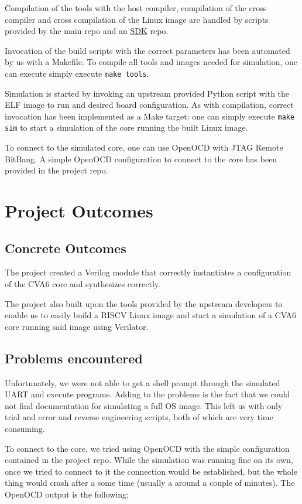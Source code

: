 \documentclass[a4paper,11pt]{article}
\begin{document}
Compilation of the tools with the host compiler, compilation of the cross compiler
and cross compilation of the Linux image are handled by scripts provided by the
main repo and an \href{https://github.com/openhwgroup/cva6-sdk}{SDK} repo.

Invocation of the build scripts with the correct parameters has been automated by us
with a Makefile. To compile all tools and images needed for simulation, one can execute
simply execute \texttt{make tools}.

Simulation is started by invoking an upstream provided Python script with the
ELF image to run and desired board configuration. As with compilation, correct
invocation has been implemented as a Make target: one can simply execute
\texttt{make sim} to start a simulation of the core running the built Linux
image.

To connect to the simulated core, one can use OpenOCD with JTAG Remote BitBang.
A simple OpenOCD configuration to connect to the core has been provided in the
project repo.

\section{Project Outcomes}

\subsection{Concrete Outcomes}

The project created a Verilog module that correctly instantiates a configuration
of the CVA6 core and synthesizes correctly.

The project also built upon the tools provided by the upstream developers to
enable us to easily build a RISCV Linux image and start a simulation of a CVA6
core running said image using Verilator.

\subsection{Problems encountered}

Unfortunately, we were not able to get a shell prompt through the simulated UART
and execute programs. Adding to the problems is the fact that we could not find
documentation for simulating a full OS image. This left us with only
trial and error and reverse engineering scripts, both of which are very time
consuming.

To connect to the core, we tried using OpenOCD with the simple configuration
contained in the project repo. While the simulation was running fine on its own,
once we tried to connect to it the connection would be established, but the
whole thing would crash after a some time (usually a around a couple of
minutes). The OpenOCD output is the following:
\end{document}
